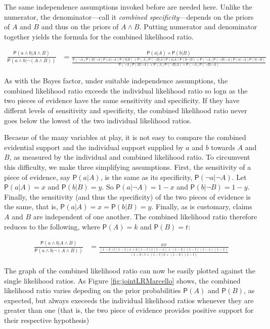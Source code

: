 \documentclass[10pt,dvipsnames,enabledeprecatedfontcommands]{scrartcl}
\newcommand{\et}{\wedge}
\newcommand{\pr}[1]{\mathsf{P}(#1)}
\begin{document}
\noindent  The same independence assumptions invoked before are needed
here. Unlike the numerator, the denominator---call it
\textit{combined specificity}---depends on the priors of \(A\) and \(B\)
and thus on the priors of \(A\wedge B\). Putting numerator and
denominator together yields the formula for the combined likelihood
ratio.

\begin{align*}
\frac{\pr{a \wedge b \vert A\wedge B}}{\pr{a \et b| \neg (A\et B)}} & = \frac{\pr{a | A} \times \pr{b | B}}{\frac{\pr{\neg A}\pr{B \vert \neg A} \pr{a | \neg A}\pr{b | B} + \pr{A}\pr{\neg B \vert A} \pr{a | A }\pr{b | \neg B} + \pr{\neg A}\pr{\neg B \vert \neg A } \pr{a | \neg A}\pr{b | \neg B}}{\pr{\neg A}\pr{B \vert \neg A} + \pr{A}\pr{\neg B \vert A } + \pr{\neg A}\pr{\neg B \vert \neg A} } }
 \end{align*}

As with the Bayes factor, under suitable independence assumptions, the
combined likelihood ratio exceeds the individual likelihood ratio so
logn as the two pieces of evidence have the same sensitivity and
specificity. If they have differnt levels of sensitivity and
specificity, the combined likelihood ratio never goes below the lowest
of the two individual likelihood ratios.

Becasue of the many variables at play, it is not easy to compare the
combined evidential support and the individual support supplied by \(a\)
and \(b\) towards \(A\) and \(B\), as measured by the individual and
combined likelihood ratio. To circumvent this difficulty, we make three
simplifying assumptions. First, the sensitivity of a piece of evidence,
say \(\pr{a |A}\), is the same as its specificity,
\(\pr{\neg a | \neg A}\). Let \(\pr{a |A}=x\) and \(\pr{b |B}=y\). So
\(\pr{a |\neg A}=1-x\) and \(\pr{b | \neg B}=1-y\). Finally, the
sensitivity (and thus the specificity) of the two pieces of evidence is
the same, that is, \(\pr{a |A}=x=\pr{b |B}=y\). Finally, as is
customary, claims \(A\) and \(B\) are independent of one another. The
combined likelihood ratio therefore reduces to the following, where
\(\pr{A}=k\) and \(\pr{B}=t\):

\begin{align*}
\frac{\pr{a \wedge b \vert A\wedge B}}{\pr{a \et b| \neg (A\et B)}} & = \frac{xx}{\frac{(1-k)t(1-x)x + k(1-t)x(1-x) + (1-k)(1-t)(1-x)(1-x)}{ \left(1-k\right) t +\left(1-t\right) k+\left(1-k\right) \left(1-t\right)}}
 \end{align*}

\noindent
The graph of the combined likelihood ratio can now be easily plotted
against the single likelihood ratios. As Figure
\ref{fig:jointLRMarcello} shows, the combined likelihood ratio varies
depeding on the prior probabilities \(\pr{A}\) and \(\pr{B}\), as
expected, but always execeeds the individual likelihood ratios whenever
they are greater than one (that is, the two piece of evidence provides
positive support for their respective hypothesis)
\end{document}

